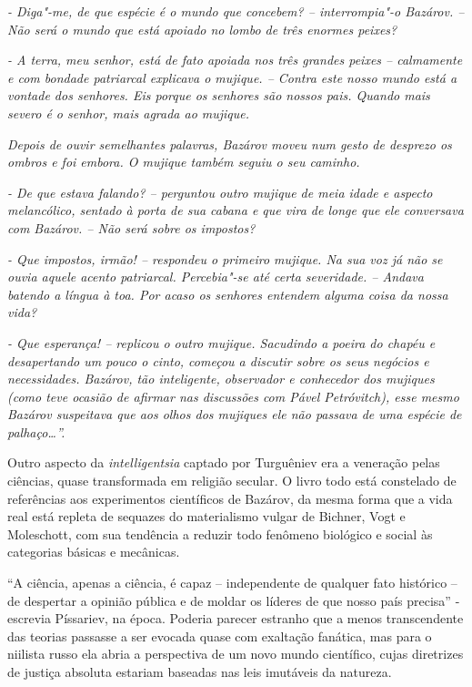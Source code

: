 \emph{- Diga"-me, de que espécie é o mundo que concebem? -- interrompia"-o
Bazárov. -- Não será o mundo que está apoiado no lombo de três enormes
peixes?}

\emph{- A terra, meu senhor, está de fato apoiada nos três grandes
peixes -- calmamente e com bondade patriarcal explicava o mujique. --
Contra este nosso mundo está a vontade dos senhores. Eis porque os
senhores são nossos pais. Quando mais severo é o senhor, mais agrada ao
mujique. }

\emph{Depois de ouvir semelhantes palavras, Bazárov moveu num gesto de
desprezo os ombros e foi embora. O mujique também seguiu o seu caminho.}

\emph{- De que estava falando? -- perguntou outro mujique de meia idade
e aspecto melancólico, sentado à porta de sua cabana e que vira de longe
que ele conversava com Bazárov. -- Não será sobre os impostos?}

\emph{- Que impostos, irmão! -- respondeu o primeiro mujique. Na sua voz
já não se ouvia aquele acento patriarcal. Percebia"-se até certa
severidade. -- Andava batendo a língua à toa. Por acaso os senhores
entendem alguma coisa da nossa vida?}

\emph{- Que esperança! -- replicou o outro mujique. Sacudindo a poeira
do chapéu e desapertando um pouco o cinto, começou a discutir sobre os
seus negócios e necessidades. Bazárov, tão inteligente, observador e
conhecedor dos mujiques (como teve ocasião de afirmar nas discussões com
Pável Petróvitch), esse mesmo Bazárov suspeitava que aos olhos dos
mujiques ele não passava de uma espécie de palhaço\ldots{}''.}

Outro aspecto da \emph{intelligentsia} captado por Turguêniev era a
veneração pelas ciências, quase transformada em religião secular. O
livro todo está constelado de referências aos experimentos científicos
de Bazárov, da mesma forma que a vida real está repleta de sequazes do
materialismo vulgar de Bichner, Vogt e Moleschott, com sua tendência a
reduzir todo fenômeno biológico e social às categorias básicas e
mecânicas.

``A ciência, apenas a ciência, é capaz -- independente de qualquer fato
histórico -- de despertar a opinião pública e de moldar os líderes de
que nosso país precisa'' - escrevia Píssariev, na época. Poderia parecer
estranho que a menos transcendente das teorias passasse a ser evocada
quase com exaltação fanática, mas para o niilista russo ela abria a
perspectiva de um novo mundo científico, cujas diretrizes de justiça
absoluta estariam baseadas nas leis imutáveis da natureza.

